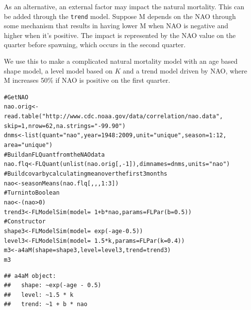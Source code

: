 \documentclass[a4paper,english,10pt]{article}\usepackage[]{graphicx}\usepackage[]{color}
\makeatletter
\newcommand{\hlnum}[1]{\textcolor[rgb]{0.2,0.2,0.2}{#1}}%
\newcommand{\hlstr}[1]{\textcolor[rgb]{0.2,0.2,0.2}{#1}}%
\newcommand{\hlcom}[1]{\textcolor[rgb]{0.2,0.267,0.4}{#1}}%
\newcommand{\hlopt}[1]{\textcolor[rgb]{0.2,0.2,0.2}{#1}}%
\newcommand{\hlstd}[1]{\textcolor[rgb]{0,0,0}{#1}}%
\newcommand{\hlkwb}[1]{\textcolor[rgb]{0.361,0.506,0.596}{#1}}%
\newcommand{\hlkwc}[1]{\textcolor[rgb]{0.361,0.506,0.596}{#1}}%
\newcommand{\hlkwd}[1]{\textcolor[rgb]{0.361,0.506,0.596}{#1}}%
\newenvironment{kframe}{%
 \def\at@end@of@kframe{}%
 \ifinner\ifhmode%
  \def\at@end@of@kframe{\end{minipage}}%
  \begin{minipage}{\columnwidth}%
 \fi\fi%
 \def\FrameCommand##1{\hskip\@totalleftmargin \hskip-\fboxsep
 \colorbox{shadecolor}{##1}\hskip-\fboxsep
     \hskip-\linewidth \hskip-\@totalleftmargin \hskip\columnwidth}%
 \MakeFramed {\advance\hsize-\width
   \@totalleftmargin\z@ \linewidth\hsize
   \@setminipage}}%
 {\par\unskip\endMakeFramed%
 \at@end@of@kframe}
\newenvironment{knitrout}{}{} %
\newcommand{\code}[1]{{\texttt{#1}}}
\makeatother
\begin{document}
As an alternative, an external factor may impact the natural mortality. This can be added through the \code{trend} model. Suppose M depends on the NAO through some mechanism that results in having lower M when NAO is negative and higher when it's positive. The impact is represented by the NAO value on the quarter before spawning, which occurs in the second quarter. 

We use this to make a complicated natural mortality model with an age based shape model, a level model based on $K$ and a trend model driven by NAO, where M increases 50\% if NAO is positive on the first quarter.

\begin{knitrout}
\color{fgcolor}\begin{kframe}
\begin{alltt}
\hlcom{# Get NAO}
\hlstd{nao.orig} \hlkwb{<-} \hlkwd{read.table}\hlstd{(}\hlstr{"http://www.cdc.noaa.gov/data/correlation/nao.data"}\hlstd{,}
    \hlkwc{skip} \hlstd{=} \hlnum{1}\hlstd{,} \hlkwc{nrow} \hlstd{=} \hlnum{62}\hlstd{,} \hlkwc{na.strings} \hlstd{=} \hlstr{"-99.90"}\hlstd{)}
\hlstd{dnms} \hlkwb{<-} \hlkwd{list}\hlstd{(}\hlkwc{quant} \hlstd{=} \hlstr{"nao"}\hlstd{,} \hlkwc{year} \hlstd{=} \hlnum{1948}\hlopt{:}\hlnum{2009}\hlstd{,} \hlkwc{unit} \hlstd{=} \hlstr{"unique"}\hlstd{,} \hlkwc{season} \hlstd{=} \hlnum{1}\hlopt{:}\hlnum{12}\hlstd{,}
    \hlkwc{area} \hlstd{=} \hlstr{"unique"}\hlstd{)}
\hlcom{# Build an FLQuant from the NAO data}
\hlstd{nao.flq} \hlkwb{<-} \hlkwd{FLQuant}\hlstd{(}\hlkwd{unlist}\hlstd{(nao.orig[,} \hlopt{-}\hlnum{1}\hlstd{]),} \hlkwc{dimnames} \hlstd{= dnms,} \hlkwc{units} \hlstd{=} \hlstr{"nao"}\hlstd{)}
\hlcom{# Build covar by calculating mean over the first 3 months}
\hlstd{nao} \hlkwb{<-} \hlkwd{seasonMeans}\hlstd{(nao.flq[, , ,} \hlnum{1}\hlopt{:}\hlnum{3}\hlstd{])}
\hlcom{# Turn into Boolean}
\hlstd{nao} \hlkwb{<-} \hlstd{(nao} \hlopt{>} \hlnum{0}\hlstd{)}
\hlstd{trend3} \hlkwb{<-} \hlkwd{FLModelSim}\hlstd{(}\hlkwc{model} \hlstd{=} \hlopt{~}\hlnum{1} \hlopt{+} \hlstd{b} \hlopt{*} \hlstd{nao,} \hlkwc{params} \hlstd{=} \hlkwd{FLPar}\hlstd{(}\hlkwc{b} \hlstd{=} \hlnum{0.5}\hlstd{))}
\hlcom{# Constructor}
\hlstd{shape3} \hlkwb{<-} \hlkwd{FLModelSim}\hlstd{(}\hlkwc{model} \hlstd{=} \hlopt{~}\hlkwd{exp}\hlstd{(}\hlopt{-}\hlstd{age} \hlopt{-} \hlnum{0.5}\hlstd{))}
\hlstd{level3} \hlkwb{<-} \hlkwd{FLModelSim}\hlstd{(}\hlkwc{model} \hlstd{=} \hlopt{~}\hlnum{1.5} \hlopt{*} \hlstd{k,} \hlkwc{params} \hlstd{=} \hlkwd{FLPar}\hlstd{(}\hlkwc{k} \hlstd{=} \hlnum{0.4}\hlstd{))}
\hlstd{m3} \hlkwb{<-} \hlkwd{a4aM}\hlstd{(}\hlkwc{shape} \hlstd{= shape3,} \hlkwc{level} \hlstd{= level3,} \hlkwc{trend} \hlstd{= trend3)}
\hlstd{m3}
\end{alltt}
\begin{verbatim}
## a4aM object:
##   shape: ~exp(-age - 0.5)
##   level: ~1.5 * k
##   trend: ~1 + b * nao
\end{verbatim}
\end{kframe}
\end{knitrout}
\end{document}
